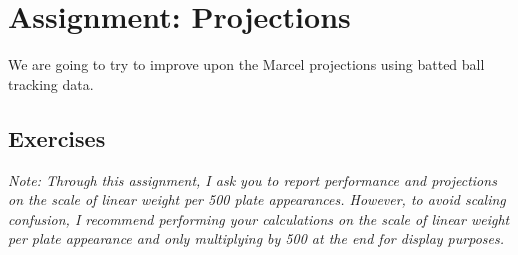 \documentclass{article}
\begin{document}
  \section*{\sc Assignment: Projections}

    We are going to try to improve upon the Marcel projections using batted ball tracking data.

    \subsection*{\sc Exercises}

      \textit{Note: Through this assignment, I ask you to report performance and projections on the scale of linear weight per 500 plate appearances. However, to avoid scaling confusion, I recommend performing your calculations on the scale of linear weight per plate appearance and only multiplying by 500 at the end for display purposes.}
\end{document}
